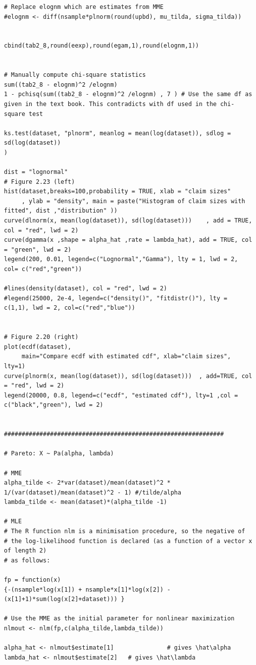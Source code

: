 \documentclass[
]{book}
\theoremstyle{definition}
\theoremstyle{definition}
\theoremstyle{definition}
\theoremstyle{definition}
\theoremstyle{remark}
\begin{document}
\begin{verbatim}
# Replace elognm which are estimates from MME
#elognm <- diff(nsample*plnorm(round(upbd), mu_tilda, sigma_tilda))


cbind(tab2_8,round(eexp),round(egam,1),round(elognm,1))


# Manually compute chi-square statistics
sum((tab2_8 - elognm)^2 /elognm)
1 - pchisq(sum((tab2_8 - elognm)^2 /elognm) , 7 ) # Use the same df as given in the text book. This contradicts with df used in the chi-square test

ks.test(dataset, "plnorm", meanlog = mean(log(dataset)), sdlog = sd(log(dataset))
)

dist = "lognormal"
# Figure 2.23 (left)
hist(dataset,breaks=100,probability = TRUE, xlab = "claim sizes" 
     , ylab = "density", main = paste("Histogram of claim sizes with fitted", dist ,"distribution" ))
curve(dlnorm(x, mean(log(dataset)), sd(log(dataset)))    , add = TRUE, col = "red", lwd = 2)
curve(dgamma(x ,shape = alpha_hat ,rate = lambda_hat), add = TRUE, col = "green", lwd = 2)
legend(200, 0.01, legend=c("Lognormal","Gamma"), lty = 1, lwd = 2, col= c("red","green"))

#lines(density(dataset), col = "red", lwd = 2)
#legend(25000, 2e-4, legend=c("density()", "fitdistr()"), lty = c(1,1), lwd = 2, col=c("red","blue"))


# Figure 2.20 (right)
plot(ecdf(dataset),
     main="Compare ecdf with estimated cdf", xlab="claim sizes", lty=1)
curve(plnorm(x, mean(log(dataset)), sd(log(dataset)))  , add=TRUE, col = "red", lwd = 2)
legend(20000, 0.8, legend=c("ecdf", "estimated cdf"), lty=1 ,col = c("black","green"), lwd = 2)


##############################################################

# Pareto: X ~ Pa(alpha, lambda)

# MME 
alpha_tilde <- 2*var(dataset)/mean(dataset)^2 * 1/(var(dataset)/mean(dataset)^2 - 1) #/tilde/alpha
lambda_tilde <- mean(dataset)*(alpha_tilde -1)

# MLE
# The R function nlm is a minimisation procedure, so the negative of
# the log-likelihood function is declared (as a function of a vector x of length 2)
# as follows:

fp = function(x)
{-(nsample*log(x[1]) + nsample*x[1]*log(x[2]) - (x[1]+1)*sum(log(x[2]+dataset))) }

# Use the MME as the initial parameter for nonlinear maximization
nlmout <- nlm(fp,c(alpha_tilde,lambda_tilde))

alpha_hat <- nlmout$estimate[1]               # gives \hat\alpha
lambda_hat <- nlmout$estimate[2]   # gives \hat\lambda



\end{verbatim}
\end{document}
